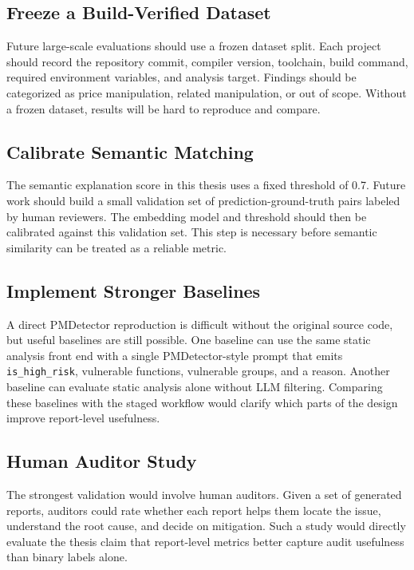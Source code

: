 \subsection{Freeze a Build-Verified Dataset}

Future large-scale evaluations should use a frozen dataset split. Each project should
record the repository commit, compiler version, toolchain, build command,
required environment variables, and analysis target. Findings should be
categorized as price manipulation, related manipulation, or out of scope.
Without a frozen dataset, results will be hard to reproduce and compare.

\subsection{Calibrate Semantic Matching}

The semantic explanation score in this thesis uses a fixed threshold of 0.7. Future work
should build a small validation set of prediction-ground-truth pairs labeled by
human reviewers. The embedding model and threshold should then be calibrated
against this validation set. This step is necessary before semantic similarity
can be treated as a reliable metric.

\subsection{Implement Stronger Baselines}

A direct PMDetector reproduction is difficult without the original source code,
but useful baselines are still possible. One baseline can use the same static
analysis front end with a single PMDetector-style prompt that emits
\texttt{is\_high\_risk}, vulnerable functions, vulnerable groups, and a reason.
Another baseline can evaluate static analysis alone without LLM filtering.
Comparing these baselines with the staged workflow would clarify which parts of
the design improve report-level usefulness.

\subsection{Human Auditor Study}

The strongest validation would involve human auditors. Given a set of generated
reports, auditors could rate whether each report helps them locate the issue,
understand the root cause, and decide on mitigation. Such a study would
directly evaluate the thesis claim that report-level metrics better capture
audit usefulness than binary labels alone.

